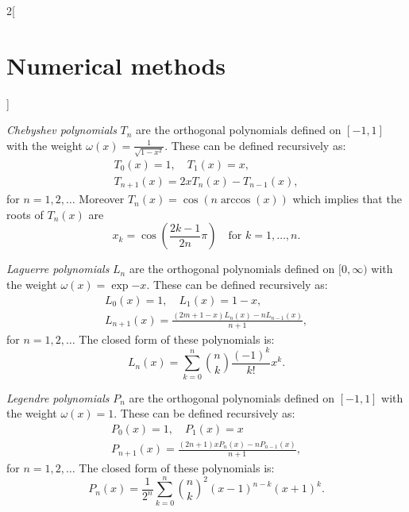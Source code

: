 \documentclass[../../../main.tex]{subfiles}
\begin{document}
\begin{multicols}{2}[\section{Numerical methods}]
\begin{theorem}
\end{theorem}
\begin{definition}
    \textit{Chebyshev polynomials} $T_n$ are the orthogonal polynomials defined on $[-1,1]$ with the weight $\omega(x)=\frac{1}{\sqrt{1-x^2}}$. These can be defined recursively as:
    \begin{gather*}
        T_0(x)=1,\quad T_1(x)=x,\\T_{n+1}(x)=2xT_n(x)-T_{n-1}(x),
    \end{gather*}
    for $n=1,2,\ldots$ Moreover $T_n(x)=\cos(n\arccos(x))$ which implies that the roots of $T_n(x)$ are $$x_k=\cos\left(\frac{2k-1}{2n}\pi\right)\quad\text{for }k=1,\ldots,n.$$
\end{definition}
\begin{definition}
    \textit{Laguerre polynomials} $L_n$ are the orthogonal polynomials defined on $[0,\infty)$ with the weight $\omega(x)=\exp{-x}$. These can be defined recursively as:
    \begin{gather*}
        L_0(x)=1,\quad L_1(x)=1-x,\\ L_{n+1}(x)=\frac{(2m+1-x)L_n(x)-nL_{n-1}(x)}{n+1},
    \end{gather*}
    for $n=1,2,\ldots$ The closed form of these polynomials is: $$L_n(x)=\sum_{k=0}^n\binom{n}{k}\frac{(-1)^k}{k!}x^k.$$ 
\end{definition}
\begin{definition}
    \textit{Legendre polynomials} $P_n$ are the orthogonal polynomials defined on $[-1,1]$ with the weight $\omega(x)=1$. These can be defined recursively as:
    \begin{gather*}
        P_0(x)=1,\quad P_1(x)=x\\P_{n+1}(x)=\frac{(2n+1)xP_n(x)-nP_{n-1}(x)}{n+1},
    \end{gather*}
    for $n=1,2,\ldots$ The closed form of these polynomials is: $$P_n(x)=\frac{1}{2^n}\sum_{k=0}^n\binom{n}{k}^2(x-1)^{n-k}(x+1)^k.$$ 
\end{definition}

\end{multicols}
\end{document}
